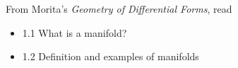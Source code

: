 \documentclass{homework}
\author{Jim Fowler}
\date{Week 1: Manifolds}
\begin{document}
\maketitle

From Morita's \textit{Geometry of Differential Forms}, read
\begin{itemize}
\item 1.1 What is a manifold?
\item 1.2 Definition and examples of manifolds
\end{itemize}
\end{document}
